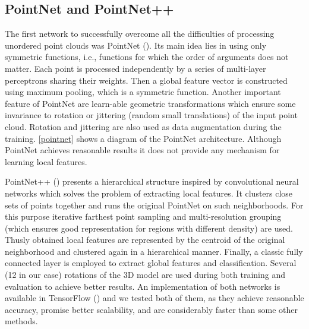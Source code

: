 \subsection{PointNet and PointNet++}
The first network to successfully overcome all the difficulties of processing unordered point clouds was PointNet (\cite{qi_pointnet:_2016}). Its main idea lies in using only symmetric functions, i.e., functions for which the order of arguments does not matter. Each point is processed independently by a series of multi-layer perceptrons sharing their weights. Then a global feature vector is constructed using maximum pooling, which is a symmetric function. Another important feature of PointNet are learn-able geometric transformations which ensure some invariance to rotation or jittering (random small translations) of the input point cloud. Rotation and jittering are also used as data augmentation during the training. \autoref{pointnet} shows a diagram of the PointNet architecture.
Although PointNet achieves reasonable results it does not provide any mechanism for learning local features.\par 
PointNet++ (\cite{qi_pointnet++:_2017}) presents a hierarchical structure inspired by convolutional neural networks which solves the problem of extracting local features. It clusters close sets of points together and runs the original PointNet on such neighborhoods. For this purpose iterative farthest point sampling and multi-resolution grouping (which ensures good representation for regions with different density) are used. Thusly obtained local features are represented by the centroid of the original neighborhood and clustered again in a hierarchical manner. Finally, a classic fully connected layer is employed to extract global features and classification.
Several (12 in our case) rotations of the 3D model are used during both training and evaluation to achieve better results. An implementation of both networks is available in TensorFlow (\cite{qi_pointnet_2016, qi_pointnet++_2017}) and we tested both of them, as they achieve reasonable accuracy, promise better scalability, and are considerably faster than some other methods.



